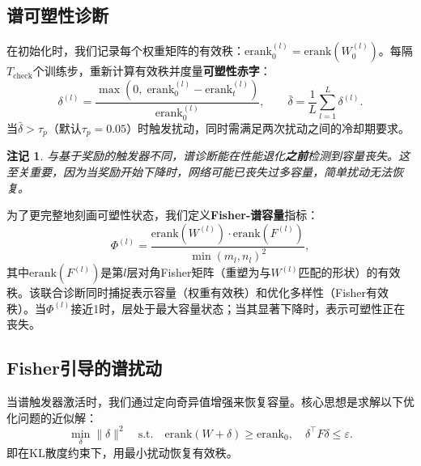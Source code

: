 \documentclass[twocolumn]{article}
\newtheorem{remark}{\bf 注记}
\newcommand{\erank}{\mathrm{erank}}
\begin{document}
\subsection{谱可塑性诊断}
\label{sec:spectral_diag}

在初始化时，我们记录每个权重矩阵的有效秩：$\erank_0^{(l)} = \erank(W_0^{(l)})$。每隔$T_{\text{check}}$个训练步，重新计算有效秩并度量\textbf{可塑性赤字}：
\begin{equation}
    \delta^{(l)} = \frac{\max(0,\; \erank_0^{(l)} - \erank_t^{(l)})}{\erank_0^{(l)}}, \qquad
    \bar{\delta} = \frac{1}{L} \sum_{l=1}^{L} \delta^{(l)}.
    \label{eq:deficit}
\end{equation}
当$\bar{\delta} > \tau_p$（默认$\tau_p = 0.05$）时触发扰动，同时需满足两次扰动之间的冷却期要求。

\begin{remark}
与基于奖励的触发器不同，谱诊断能在性能退化\textbf{之前}检测到容量丧失。这至关重要，因为当奖励开始下降时，网络可能已丧失过多容量，简单扰动无法恢复。
\end{remark}

为了更完整地刻画可塑性状态，我们定义\textbf{Fisher-谱容量}指标：
\begin{equation}
    \Phi^{(l)} = \frac{\erank(W^{(l)}) \cdot \erank(F^{(l)})}{\min(m_l, n_l)^2},
\end{equation}
其中$\erank(F^{(l)})$是第$l$层对角Fisher矩阵（重塑为与$W^{(l)}$匹配的形状）的有效秩。该联合诊断同时捕捉表示容量（权重有效秩）和优化多样性（Fisher有效秩）。当$\Phi^{(l)}$接近1时，层处于最大容量状态；当其显著下降时，表示可塑性正在丧失。


\subsection{Fisher引导的谱扰动}
\label{sec:perturb}

当谱触发器激活时，我们通过定向奇异值增强来恢复容量。核心思想是求解以下优化问题的近似解：
\begin{equation}
    \min_{\delta} \|\delta\|^2 \quad \text{s.t.} \quad \erank(W{+}\delta) \geq \erank_0, \quad \delta^\top F \delta \leq \varepsilon.
    \label{eq:perturb_opt}
\end{equation}
即在KL散度约束下，用最小扰动恢复有效秩。
\end{document}
